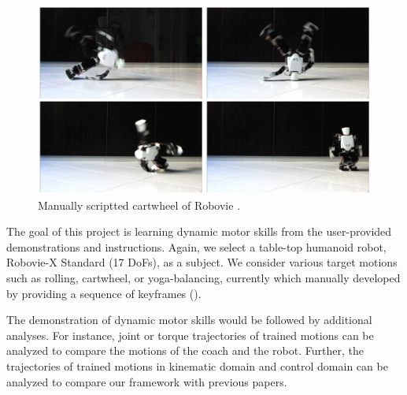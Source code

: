 \begin{figure}[htbp]
\center
  \includegraphics[width=5.0in]{images/training2_cartwheel}
  \caption{Manually scriptted cartwheel of Robovie \cite{Youtube-Robovie-X}.}
 \label{fig:cartwheel}
\end{figure}

The goal of this project is learning dynamic motor skills
from the user-provided demonstrations and instructions.
Again, we select a table-top humanoid robot, 
Robovie-X Standard (17 DoFs), as a subject.
We consider various target motions 
such as rolling, cartwheel, or yoga-balancing,
currently which manually developed by providing a sequence of keyframes 
().

The demonstration of dynamic motor skills would be followed by
additional analyses.
For instance, joint or torque trajectories of trained motions 
can be analyzed to compare the motions of the coach and the robot.
Further, the trajectories of trained motions in kinematic domain 
and control domain can be analyzed to compare our framework
with previous papers.

